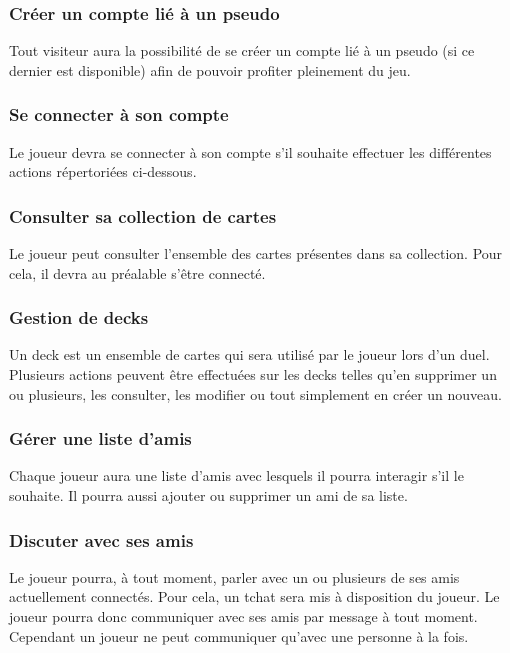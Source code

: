 \documentclass[11pt,a4paper]{article}
\begin{document}
\subsubsection*{Créer un compte lié à un pseudo}

Tout visiteur aura la possibilité de se créer un compte
lié à un pseudo (si ce dernier est disponible) afin de pouvoir
profiter pleinement du jeu.


\subsubsection*{Se connecter à son compte}

Le joueur devra se connecter à son compte s'il souhaite effectuer
les différentes actions répertoriées ci-dessous.


\subsubsection*{Consulter sa collection de cartes}

Le joueur peut consulter l'ensemble des cartes présentes dans sa
collection. Pour cela, il devra au préalable s'être connecté.


\subsubsection*{Gestion de decks}

Un deck est un ensemble de cartes qui sera utilisé par le joueur
lors d'un duel. Plusieurs actions peuvent être effectuées sur les
decks telles qu'en supprimer un ou plusieurs, les consulter, les
modifier ou tout simplement en créer un nouveau.


\subsubsection*{Gérer une liste d'amis}

Chaque joueur aura une liste d'amis avec lesquels il pourra
interagir s'il le souhaite. Il pourra aussi ajouter ou supprimer un ami de sa liste.


\subsubsection*{Discuter avec ses amis}

Le joueur pourra, à tout moment, parler avec un ou plusieurs de ses
amis actuellement connectés. Pour cela, un tchat sera mis à
disposition du joueur.  Le joueur pourra donc communiquer avec ses
amis par message à tout moment. Cependant un joueur ne peut communiquer qu'avec une personne à la fois.
\end{document}
